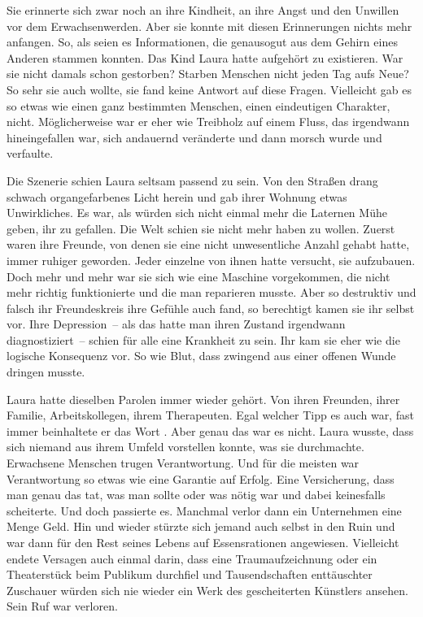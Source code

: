 \par

Sie erinnerte sich zwar noch an ihre Kindheit, an ihre Angst und den Unwillen vor dem Erwachsenwerden. Aber sie konnte mit diesen Erinnerungen nichts mehr anfangen. So, als seien es Informationen, die genausogut aus dem Gehirn eines Anderen stammen konnten. Das Kind Laura hatte aufgehört zu existieren. War sie nicht damals schon gestorben? Starben Menschen nicht jeden Tag aufs Neue? So sehr sie auch wollte, sie fand keine Antwort auf diese Fragen. Vielleicht gab es so etwas wie einen ganz bestimmten Menschen, einen eindeutigen Charakter, nicht. Möglicherweise war er eher wie Treibholz auf einem Fluss, das irgendwann hineingefallen war, sich andauernd veränderte und dann morsch wurde und verfaulte.

\par

Die Szenerie schien Laura seltsam passend zu sein. Von den Straßen drang schwach organgefarbenes Licht herein und gab ihrer Wohnung etwas Unwirkliches. Es war, als würden sich nicht einmal mehr die Laternen Mühe geben, ihr zu gefallen. Die Welt schien sie nicht mehr haben zu wollen. Zuerst waren ihre Freunde, von denen sie eine nicht unwesentliche Anzahl gehabt hatte, immer ruhiger geworden. Jeder einzelne von ihnen hatte versucht, sie aufzubauen. Doch mehr und mehr war sie sich wie eine Maschine vorgekommen, die nicht mehr richtig funktionierte und die man reparieren musste. Aber so destruktiv und falsch ihr Freundeskreis ihre Gefühle auch fand, so berechtigt kamen sie ihr selbst vor. Ihre Depression~-- als das hatte man ihren Zustand irgendwann diagnostiziert~-- schien für alle eine Krankheit zu sein. Ihr kam sie eher wie die logische Konsequenz vor. So wie Blut, dass zwingend aus einer offenen Wunde dringen musste.

\par

Laura hatte dieselben Parolen immer wieder gehört. Von ihren Freunden, ihrer Familie, Arbeitskollegen, ihrem Therapeuten.  Egal welcher Tipp es auch war, fast immer beinhaltete er das Wort . Aber genau das war es nicht. Laura wusste, dass sich niemand aus ihrem Umfeld vorstellen konnte, was sie durchmachte. Erwachsene Menschen trugen Verantwortung. Und für die meisten war Verantwortung so etwas wie eine Garantie auf Erfolg. Eine Versicherung, dass man genau das tat, was man sollte oder was nötig war und dabei keinesfalls scheiterte. Und doch passierte es. Manchmal verlor dann ein Unternehmen eine Menge Geld. Hin und wieder stürzte sich jemand auch selbst in den Ruin und war dann für den Rest seines Lebens auf Essensrationen angewiesen. Vielleicht endete Versagen auch einmal darin, dass eine Traumaufzeichnung oder ein Theaterstück beim Publikum durchfiel und Tausendschaften enttäuschter Zuschauer würden sich nie wieder ein Werk des gescheiterten Künstlers ansehen. Sein Ruf war verloren.

